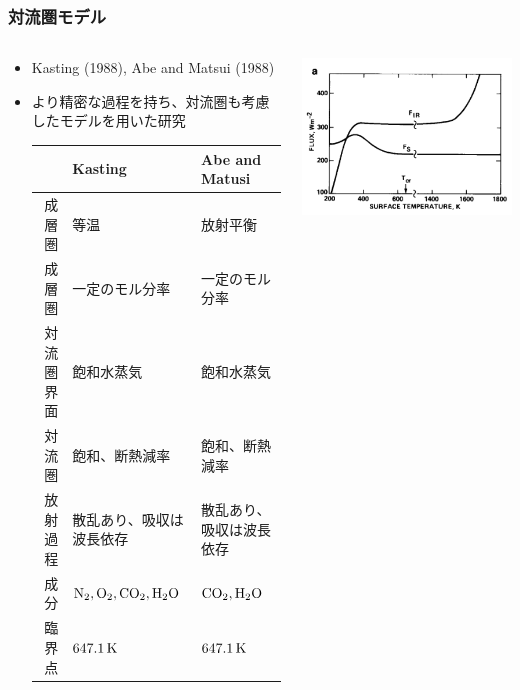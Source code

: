 \documentclass[aspectratio=149]{beamer}
\begin{document}
\begin{frame}
	\frametitle{対流圏モデル}
	\small
	\begin{columns}[T,onlytextwidth]
		\begin{column}{.7\textwidth}
			\begin{itemize}
				\item Kasting (1988), Abe and Matsui (1988)
				\item より精密な過程を持ち、対流圏も考慮したモデルを用いた研究
					\begin{table}
						\tiny
						\centering
						\begin{tabular}{rll}
							\hline
							 &Kasting&Abe and Matusi\\
							\hline
							成層圏&等温&放射平衡\\
							成層圏&一定のモル分率&一定のモル分率\\
							対流圏界面&飽和水蒸気&飽和水蒸気\\
							対流圏&飽和、断熱減率&飽和、断熱減率\\
							放射過程&散乱あり、吸収は波長依存&散乱あり、吸収は波長依存\\
							成分&\(\ce{N2, O2, CO2, H2O}\)&\(\ce{CO2, H2O}\)\\
							臨界点&\(647.1\hmu{K}\)&\(647.1\hmu{K}\)\\
							\hline
						\end{tabular}
					\end{table}
			\end{itemize}
		\end{column}
		\begin{column}{.3\textwidth}
			\centering
			\includegraphics[width=\textwidth]{kasting7a.png}\\

\end{column}
\end{columns}
\end{frame}
\end{document}
